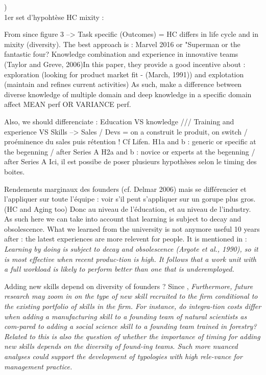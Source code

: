 \begin{itemize}
\begin{itemize}
)\\

1er set d'hypohtèse HC mixity :\newline

From \citep{marvel2016human} since figure 3 --> Task specific (Outcomes) = HC differs in life cycle and in mixity (diversity). The best approach is : Marvel  2016 or "Superman or the fantastic four? Knowledge combination and experience in innovative teams (Taylor and Greve, 2006)In this paper, they provide a good incentive about : exploration (looking for product market fit - (March, 1991)) and explotation (maintain and refines current activities)\newline
As such, \citet{taylor2006superman} make a difference between diverse knowledge of multiple domain and deep knowledge in a specific domain affect MEAN perf OR VARIANCE perf.

Also, we should differenciate : Education VS knowledge /// Training and experience VS Skills
--> Sales / Devs = on a construit le produit, on switch / proéminence du sales puis rétention ! Cf Lifen.\newline
H1a and b : generic or specific at the begenning / after Series A\newline
H2a and b : novice or experts at the begenning / after Series A\newline
Ici, il est possibe de poser plusieurs hypothèses selon le timing des boites.\newline

Rendements marginaux des founders (cf. Delmar 2006) mais se différencier et l'appliquer sur toute l'équipe : voir s'il peut s'appliquer sur un gorupe plus gros. (HC and Aging too) Donc au niveau de l'éducation, et au niveau de l'industry.\newline
As such here we can take into account that learning is subject to decay and obsolescence. What we learned from the university is not anymore useful 10 years after : the latest experiences are more relevent for people. It is mentioned in \citet{taylor2006superman} : \textit{Learning by doing is subject to decay and obsolescence (Argote et al., 1990), so it is most effective when recent produc-tion is high. It follows that a work unit with a full workload is likely to perform better than one that is underemployed.}

Adding new skills depend on diversity of founders ?
Since \citet{grillitsch2020does}, \textit{Furthermore, future research may zoom in on the type of new skill recruited to the firm conditional to the existing portfolio of skills in the firm. For instance, do integra-tion costs differ when adding a manufacturing skill to a founding team of natural scientists as com-pared to adding a social science skill to a founding team trained in forestry? Related to this is also the question of whether the importance of timing for adding new skills depends on the diversity of found-ing teams. Such more nuanced analyses could support the development of typologies with high rele-vance for management practice.}


\end{itemize}
\end{itemize}
